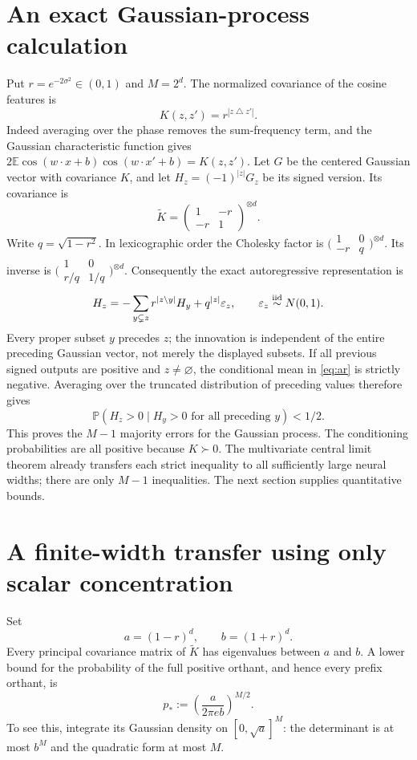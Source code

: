\documentclass[11pt]{article}
\newcommand{\E}{\mathbb E}
\newcommand{\Pp}{\mathbb P}
\begin{document}
\section{An exact Gaussian-process calculation}
Put $r=e^{-2\sigma^2}\in(0,1)$ and $M=2^d$. The normalized covariance
of the cosine features is
\[
 K(z,z')=r^{|z\mathbin\triangle z'|}.
\]
Indeed averaging over the phase removes the sum-frequency term, and
the Gaussian characteristic function gives
$2\E\cos(w\cdot x+b)\cos(w\cdot x'+b)=K(z,z')$.
Let $G$ be the centered Gaussian vector with covariance $K$, and let
$H_z=(-1)^{|z|}G_z$ be its signed version. Its covariance is
\[
 \widetilde K=
 \begin{pmatrix}1&-r\\-r&1\end{pmatrix}^{\otimes d}.
\]
Write $q=\sqrt{1-r^2}$. In lexicographic order the Cholesky factor is
$\bigl(\begin{smallmatrix}1&0\\-r&q\end{smallmatrix}\bigr)^{\otimes d}$.
Its inverse is
$\bigl(\begin{smallmatrix}1&0\\r/q&1/q\end{smallmatrix}\bigr)^{\otimes d}$.
Consequently the exact autoregressive representation is
\begin{equation}\label{eq:ar}
 H_z=-\sum_{y\subsetneq z}r^{|z\setminus y|}H_y+q^{|z|}\varepsilon_z,
 \qquad \varepsilon_z\stackrel{\rm iid}{\sim}N(0,1).
\end{equation}
Every proper subset $y$ precedes $z$; the innovation is independent of
the entire preceding Gaussian vector, not merely the displayed subsets.
If all previous signed outputs are positive and $z\ne\varnothing$,
the conditional mean in \eqref{eq:ar} is strictly negative. Averaging
over the truncated distribution of preceding values therefore gives
\[
 \Pp(H_z>0\mid H_y>0\text{ for all preceding }y)<1/2.
\]
This proves the $M-1$ majority errors for the Gaussian process. The
conditioning probabilities are all positive because $K\succ0$.
The multivariate central limit theorem already transfers each strict
inequality to all sufficiently large neural widths; there are only
$M-1$ inequalities. The next section supplies quantitative bounds.

\section{A finite-width transfer using only scalar concentration}
Set
\[
 a=(1-r)^d,\qquad b=(1+r)^d.
\]
Every principal covariance matrix of $\widetilde K$ has eigenvalues
between $a$ and $b$. A lower bound for the probability of the full
positive orthant, and hence every prefix orthant, is
\begin{equation}\label{eq:orthantlower}
 p_*:=\left(\frac{a}{2\pi e b}\right)^{M/2}.
\end{equation}
To see this, integrate its Gaussian density on $[0,\sqrt a]^M$:
the determinant is at most $b^M$ and the quadratic form at most $M$.
\end{document}
